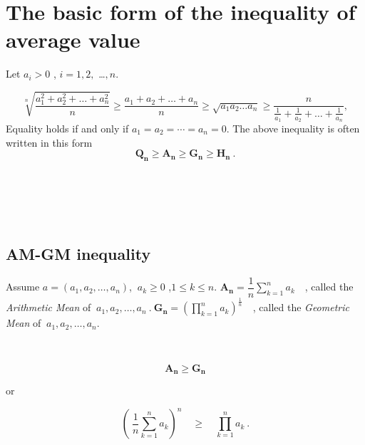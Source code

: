 \documentclass{memoir}
\begin{document}
\section{The basic form of the inequality of average value}

\begin{theorem}
	
	Let $a_i>0$ , $i=1,2,$ \dots $,n.$
	
	\begin{equation}
	\sqrt[n]{\frac{a_1^2+a_2^2+\dots+a_n^2}{n}}
	\geqslant\frac{a_1+a_2+\dots+a_n}{n}
	\geqslant\sqrt{a_1a_2\dots a_n}
	\geqslant\frac{n}{\frac{1}{a_1}+\frac{1}{a_2}+\dots +\frac{1}{a_n}},
	\end{equation}
	Equality holds if and only if
	$a_1=a_2=\cdots=a_n=0$.	
	The above inequality is often written in this form
	\[\boldsymbol{Q_n}\geqslant
	\boldsymbol{A_n}\geqslant
	\boldsymbol{G_n}\geqslant
	\boldsymbol{H_n}\ .\]
	\\
\end{theorem}
\par 



\par  \ \par  \ 

\subsection{AM-GM inequality}


\begin{definition}
	
	Assume $a=(a_1,a_2,\dots ,a_n)$,
	$\ a_k\geqslant 0$
	,$1\leqslant k\leqslant n$.
	$\boldsymbol{A_n}=\dfrac{1}{n}\sum\limits_{k=1}^n a_k\quad$,
	called the \emph{Arithmetic Mean} of
	$\ a_1,a_2,\dots ,a_n\ .\ 
	\boldsymbol{G_n}=(\prod\limits_{k=1}^n a_k)^\frac{1}{n}\quad$,
	called the \emph{Geometric Mean} of 
	$\ a_1,a_2,\dots ,a_n$.
	
\end{definition}
\par  \ 

\begin{theorem}
	\begin{equation}
	\boldsymbol{A_n}\geqslant \boldsymbol{G_n}	
	\end{equation}
	
	or
	
	\begin{equation}
	\left( \ \frac{1}{n}\sum_{k=1}^n a_k \right)^n\quad\geqslant\quad \prod\limits_{k=1}^n a_k \  .
	\end{equation}
\end{theorem}
\end{document}

